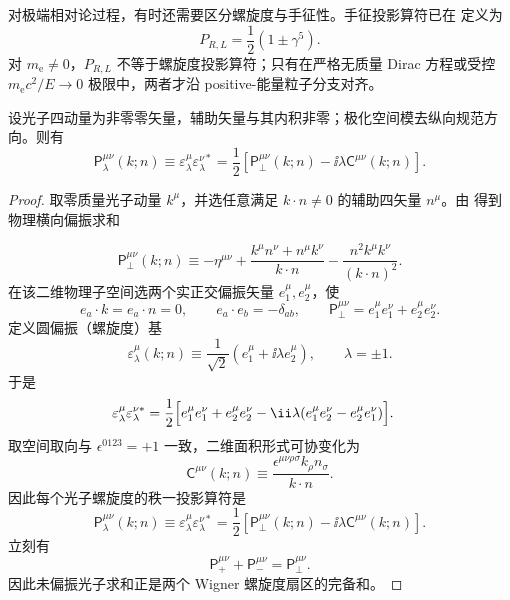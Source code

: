 

对极端相对论过程，有时还需要区分螺旋度与手征性。手征投影算符已在  定义为
\begin{equation*}
 P_{R,L}=\frac12(1\pm\gamma^5).
\end{equation*}
对 $m_{\mathrm e}\neq0$，$P_{R,L}$ 不等于螺旋度投影算符；只有在严格无质量 Dirac 方程或受控 $m_{\mathrm e} c^2/E\to0$ 极限中，两者才沿 positive-能量粒子分支对齐。



\begin{proposition}[横向二维空间的螺旋度投影]
设光子四动量为非零零矢量，辅助矢量与其内积非零；极化空间模去纵向规范方向。则有
\begin{equation}
 {
 \mathsf P_\lambda^{\mu\nu}(k;n)
 \equiv
 \varepsilon_\lambda^\mu\varepsilon_\lambda^{\nu *}
 =\frac12\left[
 \mathsf P_\perp^{\mu\nu}(k;n)
 -\ii\lambda\mathsf C^{\mu\nu}(k;n)
 \right].}
\label{eq:photon-helicity-projector-covariant-dp9}
\end{equation}
\end{proposition}
\begin{proof}
取零质量光子动量 $k^\mu$，并选任意满足 $k\!\cdot n\neq0$ 的辅助四矢量 $n^\mu$。由 得到物理横向偏振求和

\begin{equation*}
 \mathsf P_\perp^{\mu\nu}(k;n)
 \equiv
 -\eta^{\mu\nu}
 +\frac{k^\mu n^\nu+n^\mu k^\nu}{k\!\cdot n}
 -\frac{n^2k^\mu k^\nu}{(k\!\cdot n)^2}.
\end{equation*}
在该二维物理子空间选两个实正交偏振矢量 $e_1^\mu,e_2^\mu$，使
\begin{equation*}
 e_a\!\cdot k=e_a\!\cdot n=0,
 \qquad
 e_a\!\cdot e_b=-\delta_{ab},
 \qquad
 \mathsf P_\perp^{\mu\nu}=e_1^\mu e_1^\nu+e_2^\mu e_2^\nu.
\end{equation*}
定义圆偏振（螺旋度）基
\begin{equation*}
 \varepsilon_\lambda^\mu(k;n)
 \equiv\frac1{\sqrt2}
 \left(e_1^\mu+\ii\lambda e_2^\mu\right),
 \qquad \lambda=\pm1.
 \end{equation*}
于是
\begin{align*}
 \varepsilon_\lambda^\mu\varepsilon_\lambda^{\nu *}
 &=\frac12\Bigl[
 e_1^\mu e_1^\nu+e_2^\mu e_2^\nu
 -\ii\lambda(e_1^\mu e_2^\nu-e_2^\mu e_1^\nu)
 \Bigr].
 \end{align*}
取空间取向与 $\epsilon^{0123}=+1$ 一致，二维面积形式可协变化为
\begin{equation*}
 \mathsf C^{\mu\nu}(k;n)
 \equiv
 \frac{\epsilon^{\mu\nu\rho\sigma}k_\rho n_\sigma}
 {k\!\cdot n}.
 \end{equation*}
因此每个光子螺旋度的秩一投影算符是
\begin{equation*}
 {
 \mathsf P_\lambda^{\mu\nu}(k;n)
 \equiv
 \varepsilon_\lambda^\mu\varepsilon_\lambda^{\nu *}
 =\frac12\left[
 \mathsf P_\perp^{\mu\nu}(k;n)
 -\ii\lambda\mathsf C^{\mu\nu}(k;n)
 \right].}
 \end{equation*}
立刻有
\begin{equation*}
 \mathsf P_{+}^{\mu\nu}+\mathsf P_{-}^{\mu\nu}
 =\mathsf P_\perp^{\mu\nu}.
 \end{equation*}
因此未偏振光子求和正是两个 Wigner 螺旋度扇区的完备和。
\end{proof}


